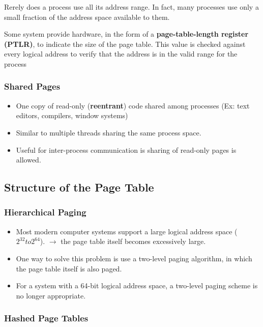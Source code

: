 \documentclass[10pt]{article}
\newcommand{\tf}{\textbf}
\newcommand{\rarrow}{\rightarrow}
\begin{document}
\par{Rerely does a process use all its address range. In fact, many processes use only a small fraction of the address space available to them.}

\par{Some system provide hardware, in the form of a \tf{page-table-length register (PTLR)}, to indicate the size of the page table. This value is checked against every logical address to verify that the address is in the valid range for the process}

\subsubsection{Shared Pages}

\begin{itemize}
	\item One copy of read-only (\tf{reentrant}) code shared among processes (Ex: text editors, compilers, window systems)
	\item Similar to multiple threads sharing the same process space.
	\item Useful for inter-process communication is sharing of read-only pages is allowed.
\end{itemize}

\subsection{Structure of the Page Table}

\subsubsection{Hierarchical Paging}

\begin{itemize}
	\item Most modern computer systems support a large logical address space ($2^{32} to 2^{64}$). $\rarrow$ the page table itself becomes excessively large.
	\item One way to solve this problem is use a two-level paging algorithm, in which the page table itself is also paged.
	\item For a system with a 64-bit logical address space, a two-level paging scheme is no longer appropriate.
\end{itemize}

\subsubsection{Hashed Page Tables}
\end{document}
